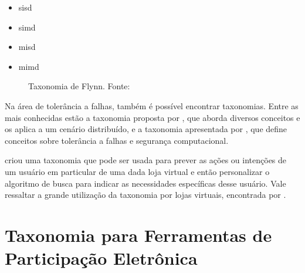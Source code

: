 \begin{minipage}{.66\textwidth}
    \begin{singlespace}
        \begin{itemize}
            \item \acrfull{sisd}
            \item \acrfull{simd}
            \item \acrfull{misd}
            \item \acrfull{mimd}
        \end{itemize}
    \end{singlespace}
\end{minipage}
\vspace{0.5cm}

\begin{figure}[!ht]
    \caption{Taxonomia de Flynn. Fonte: }
    \label{fig:taxonomiaFlynn}  
\end{figure}

\vspace{0.5cm}
\par
Na área de tolerância a falhas, também é possível encontrar taxonomias. Entre as mais conhecidas estão a taxonomia proposta por
, que aborda diversos conceitos e os aplica a um cenário distribuído,
e a taxonomia apresentada por , que define conceitos sobre tolerância a falhas e segurança computacional.

\par
{} criou uma taxonomia que pode ser usada para prever as ações ou intenções de um usuário em particular de uma dada loja virtual
e então personalizar o algoritmo de busca para indicar as necessidades específicas desse usuário. Vale ressaltar a grande utilização da taxonomia por lojas virtuais,
encontrada por \cite{sondhi2018taxonomy}.

\section{Taxonomia para Ferramentas de Participação Eletrônica}
\label{sec:taxonomia e-part tools}

